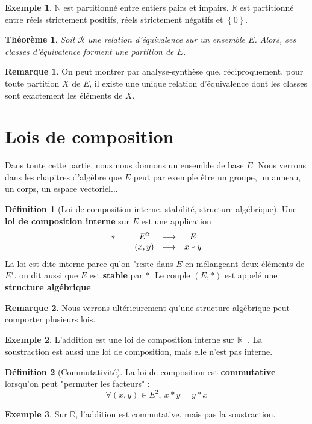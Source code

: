 \documentclass[french]{book}
\newcommand{\N}{\mathbb{N}}
\newcommand{\R}{\mathbb{R}}
\theoremstyle{plain}
\newtheorem{thm}{Théorème}[chapter]
\theoremstyle{definition}
\newtheorem{dfn}{Définition}[chapter]
\newtheorem{exa}{Exemple}[chapter]
\newtheorem{rmq}{Remarque}[chapter]
\theoremstyle{remark}
\begin{document}
\begin{exa}
	$\N$ est partitionné entre entiers pairs et impairs. $\R$ est partitionné entre réels strictement positifs, réels strictement négatifs et $\left\{0\right\}$.
\end{exa}
\begin{thm}
	Soit $\mathcal{R}$ une relation d'équivalence sur un ensemble $E$. Alors, ses classes d'équivalence forment une partition de $E$.
\end{thm}
\begin{rmq}
	On peut montrer par analyse-synthèse que, réciproquement, pour toute partition $X$ de $E$, il existe une unique relation d'équivalence dont les classes sont exactement les éléments de $X$.
\end{rmq}
\section{Lois de composition}
Dans toute cette partie, nous nous donnons un ensemble de base $E$. Nous verrons dans les chapitres d'algèbre que $E$ peut par exemple être un groupe, un anneau, un corps, un espace vectoriel...
\begin{dfn}[Loi de composition interne, stabilité, structure algébrique]
	Une \textbf{loi de composition interne} sur $E$ est une application 
	$$
	\begin{array}[t]{ccccc}
		*&: & E^2 & \longrightarrow & E \\
		&& (x,y) & \longmapsto & x*y
	\end{array}
	$$ La loi est dite interne parce qu'on "reste dans $E$ en mélangeant deux éléments de $E$". on dit aussi que $E$ est \textbf{stable} par $*$. Le couple $(E,*)$ est appelé une \textbf{structure algébrique}.
\end{dfn}
\begin{rmq}
	Nous verrons ultérieurement qu'une structure algébrique peut comporter plusieurs lois.
\end{rmq}
\begin{exa}
	L'addition est une loi de composition interne sur $\R_+$. La soustraction est aussi une loi de composition, mais elle n'est pas interne.
\end{exa}
\begin{dfn}[Commutativité]
	La loi de composition est \textbf{commutative} lorsqu'on peut "permuter les facteurs" : $$\forall(x,y)\in E^2,\ x*y=y*x$$
\end{dfn}
\begin{exa}
	Sur $\R$, l'addition est commutative, mais pas la soustraction.
\end{exa}
\end{document}
